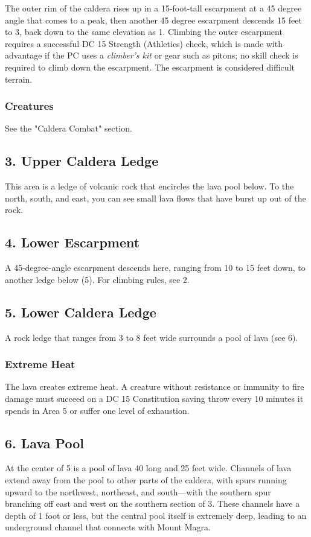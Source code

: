 \documentclass[10pt,a4paper,twoside,bg=print,twocolumn,openany,nodeprecatedcode]{dndbook}
\begin{document}
The outer rim of the caldera rises up in a 15-foot-tall escarpment at a 45 degree angle that comes to a peak, then another 45 degree escarpment descends 15 feet to 3, back down to the same elevation as 1. Climbing the outer escarpment requires a successful DC 15 Strength (Athletics) check, which is made with advantage if the PC uses a \textit{climber's kit} or gear such as pitons; no skill check is required to climb down the escarpment. The escarpment is considered difficult terrain.

\subsubsection{Creatures}
See the "Caldera Combat" section.

\subsection{3. Upper Caldera Ledge}
This area is a ledge of volcanic rock that encircles the lava pool below. To the north, south, and east, you can see small lava flows that have burst up out of the rock.

\subsection{4. Lower Escarpment}
A 45-degree-angle escarpment descends here, ranging from 10 to 15 feet down, to another ledge below (5). For climbing rules, see 2.

\subsection{5. Lower Caldera Ledge}
A rock ledge that ranges from 3 to 8 feet wide surrounds a pool of lava (see 6).

\subsubsection{Extreme Heat}
The lava creates extreme heat. A creature without resistance or immunity to fire damage must succeed on a DC 15 Constitution saving throw every 10 minutes it spends in Area 5 or suffer one level of exhaustion.

\subsection{6. Lava Pool}
At the center of 5 is a pool of lava 40 long and 25 feet wide. Channels of lava extend away from the pool to other parts of the caldera, with spurs running upward to the northwest, northeast, and south—with the southern spur branching off east and west on the southern section of 3. These channels have a depth of 1 foot or less, but the central pool itself is extremely deep, leading to an underground channel that connects with Mount Magra.
\end{document}
